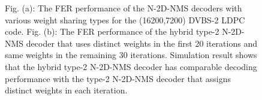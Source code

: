 \documentclass [PhD] {uclathes}
\begin{document}
\begin{figure}[t]
    \centering
    \hfill
    \caption{ Fig. (a): The FER performance of
        the N-2D-NMS decoders with various weight sharing types for the (16200,7200) DVBS-2 LDPC code.
        Fig. (b): The FER performance of the hybrid type-2 N-2D-NMS decoder that uses distinct weights in the first 20 iterations and same weights in the remaining 30 iterations. Simulation result shows that the hybrid type-2 N-2D-NMS decoder has comparable decoding performance with the type-2 N-2D-NMS decoder that assigns distinct weights in each iteration.  }
\end{figure}
\end{document}
